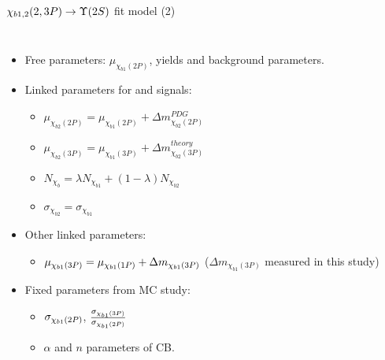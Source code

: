 \begin{frame}{$\chi_{b1,2}(2,3P) \to \TwoS$ fit model (2)}
\begin{columns}[T]
\begin{itemize}
\item Free parameters: $\mu_{\chi_{b1}(2P)}$, yields and background parameters.
\item Linked parameters for \chibone and \chibtwo signals:
    \begin{itemize}
    \item $\mu_{\chi_{b2}(2P)} = \mu_{\chi_{b1}(2P)} + \Delta m_{\chi_{b2}(2P)}^{PDG}$
    \item $\mu_{\chi_{b2}(3P)} = \mu_{\chi_{b1}(3P)} + \Delta m_{\chi_{b2}(3P)}^{theory}$
    \item $N_{\chi_{b}} = \lambda N_{\chi_{b1}} + (1-\lambda) N_{\chi_{b2}}$
    \item $\sigma_{\chi_{b2}} = \sigma_{\chi_{b1}}$
    \end{itemize}
\item Other linked parameters:    
    \begin{itemize}
        \item $\mu_{\chi_{b 1}(3P)} = \mu_{\chi_{b 1}(1P)} + \Delta m_{\chi_{b1}(3P)}$ ($\Delta m_{\chi_{b1}(3P)}$ measured in this study)
    \end{itemize}
\item Fixed parameters from MC study:
    \begin{itemize}
    \item $\sigma_{\chi_{b 1}(2P)}$,  $\frac{\sigma_{\chi_{b 1}(3P)}}{\sigma_{\chi_{b 1}(2P)}}$
    \item $\alpha$ and $n$ parameters of CB.
    \end{itemize}
\end{itemize}
\end{columns}
\end{frame}
